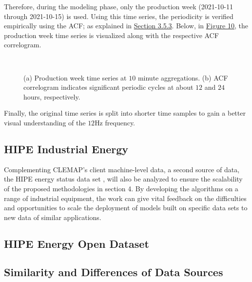 Therefore, during the modeling phase, only the production week (2021-10-11 through 2021-10-15) is used. Using this time series, the periodicity is verified empirically using the ACF; as explained in \hyperlink{section.3.5.3}{Section 3.5.3}. Below, in \hyperlink{figure.10}{Figure 10}, the production week time series is visualized along with the respective ACF correlogram. 

\begin{figure}
    \centering
    \graphicspath{ {./images/} }
     \\
    \caption{(a) Production week time series at $10$ minute aggregations. (b) ACF correlogram indicates significant periodic cycles at about $12$ and $24$ hours, respectively.} \label{fig:AB}
    \label{fig:my_label}
\end{figure}

Finally, the original time series is split into shorter time samples to gain a better visual understanding of the $12$Hz frequency.


\subsection{HIPE Industrial Energy}
Complementing CLEMAP's client machine-level data, a second source of data, the HIPE energy status data set \cite{HIPE}, will also be analyzed to ensure the scalability of the proposed methodologies in section 4. By developing the algorithms on a range of industrial equipment, the work can give vital feedback on the difficulties and opportunities to scale the deployment of models built on specific data sets to new data of similar applications. 

\subsection{HIPE Energy Open Dataset}

\subsection{Similarity and Differences of Data Sources}